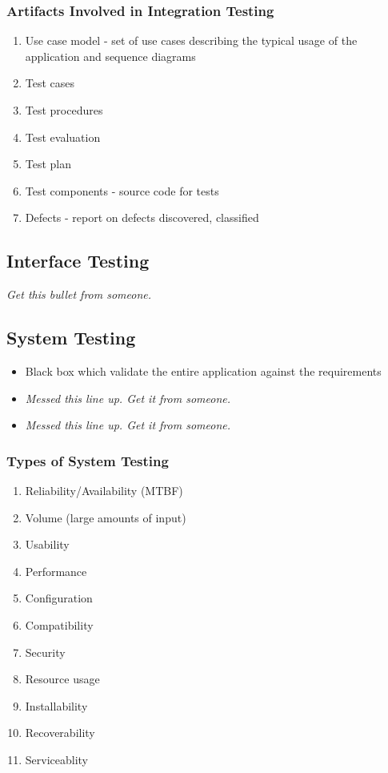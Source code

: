 \documentclass{report}
\begin{document}
				\subsubsection{Artifacts Involved in Integration Testing}
					\begin{enumerate}
						\item Use case model - set of use cases describing the typical usage of the application and sequence diagrams
						\item Test cases
						\item Test procedures
						\item Test evaluation
						\item Test plan
						\item Test components - source code for tests
						\item Defects - report on defects discovered, classified
					\end{enumerate}
			\subsection{Interface Testing}
				\textit{Get this bullet from someone.}
			\subsection{System Testing}
				\begin{itemize}
					\item Black box which validate the entire application against the requirements
					\item \textit{Messed this line up. Get it from someone.}
					\item \textit{Messed this line up. Get it from someone.}
				\end{itemize}
				\subsubsection{Types of System Testing}
					\begin{enumerate}
						\item Reliability/Availability (MTBF)
						\item Volume (large amounts of input)
						\item Usability
						\item Performance
						\item Configuration
						\item Compatibility
						\item Security
						\item Resource usage
						\item Installability
						\item Recoverability
						\item Serviceablity
					\end{enumerate}
\end{document}
